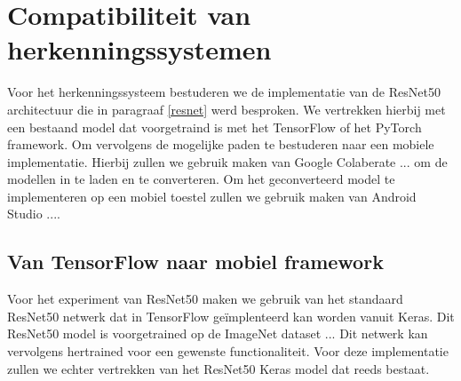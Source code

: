 \chapter{Compatibiliteit van herkenningssystemen}
Voor het herkenningssysteem bestuderen we de implementatie van de ResNet50 architectuur die in paragraaf \ref{resnet} werd besproken.
We vertrekken hierbij met een bestaand model dat voorgetraind is met het TensorFlow of het PyTorch framework.
Om vervolgens de mogelijke paden te bestuderen naar een mobiele implementatie.
Hierbij zullen we gebruik maken van Google Colaberate ... om de modellen in te laden en te converteren.
Om het geconverteerd model te implementeren op een mobiel toestel zullen we gebruik maken van Android Studio ....



\section{Van TensorFlow naar mobiel framework}
Voor het experiment van ResNet50 maken we gebruik van het standaard ResNet50 netwerk dat in TensorFlow ge\"implenteerd kan worden vanuit Keras.
Dit ResNet50 model is voorgetrained op de ImageNet dataset ... 
Dit netwerk kan vervolgens hertrained voor een gewenste functionaliteit.
Voor deze implementatie zullen we echter vertrekken van het ResNet50 Keras model dat reeds bestaat.

